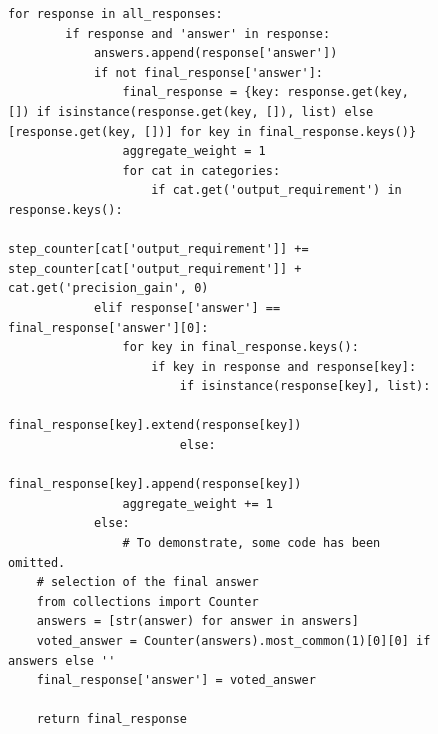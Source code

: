 \documentclass[11pt]{article}
\newcommand{\framework}{Gödel Agent\xspace}
\begin{document}
\begin{figure}[ht]
\begin{lstlisting}[style=pythonstyle, caption={Code of the best policy found by \framework for DROP.}]
    for response in all_responses:
        if response and 'answer' in response:
            answers.append(response['answer'])
            if not final_response['answer']:
                final_response = {key: response.get(key, []) if isinstance(response.get(key, []), list) else [response.get(key, [])] for key in final_response.keys()}
                aggregate_weight = 1
                for cat in categories:
                    if cat.get('output_requirement') in response.keys():
                        step_counter[cat['output_requirement']] += step_counter[cat['output_requirement']] + cat.get('precision_gain', 0)
            elif response['answer'] == final_response['answer'][0]:
                for key in final_response.keys():
                    if key in response and response[key]:
                        if isinstance(response[key], list):
                            final_response[key].extend(response[key])
                        else:
                            final_response[key].append(response[key])
                aggregate_weight += 1
            else:
                # To demonstrate, some code has been omitted.
    # selection of the final answer
    from collections import Counter
    answers = [str(answer) for answer in answers]
    voted_answer = Counter(answers).most_common(1)[0][0] if answers else ''
    final_response['answer'] = voted_answer

    return final_response
\end{lstlisting}
\end{figure}
\end{document}
